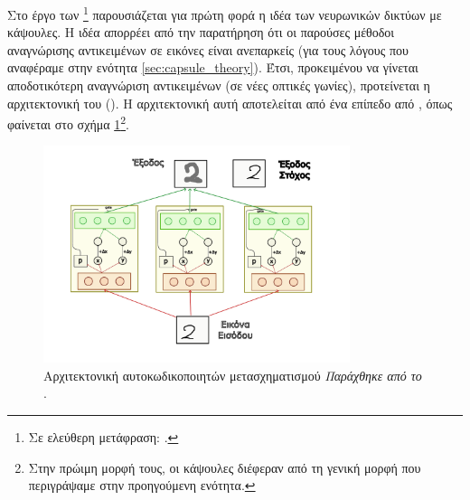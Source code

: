 \subsubsection{}

Στο έργο των \footnote{Σε ελεύθερη μετάφραση: .} \cite{hinton2011transforming} παρουσιάζεται για πρώτη φορά η ιδέα των νευρωνικών δικτύων με κάψουλες. Η ιδέα απορρέει από την παρατήρηση ότι οι παρούσες μέθοδοι αναγνώρισης αντικειμένων σε εικόνες είναι ανεπαρκείς (για τους λόγους που αναφέραμε στην ενότητα \ref{sec:capsule_theory}). Έτσι, προκειμένου να γίνεται αποδοτικότερη αναγνώριση αντικειμένων (σε νέες οπτικές γωνίες), προτείνεται η αρχιτεκτονική του  (). Η αρχιτεκτονική αυτή αποτελείται από ένα επίπεδο από , όπως φαίνεται στο σχήμα \ref{fig:trans_autoencoder}\footnote{Στην πρώιμη μορφή τους, οι κάψουλες διέφεραν από τη γενική μορφή που περιγράψαμε στην προηγούμενη ενότητα.}.\par

\begin{figure}[h]
    \centering
    \includegraphics[width=0.8\textwidth]{images/chapter realted work/transforming_auto_gr.pdf}
    \caption{Αρχιτεκτονική αυτο\textendash κωδικοποιητών μετασχηματισμού \textit{Παράχθηκε από το \href{https://inkscape.org/}{}}.}
    \label{fig:trans_autoencoder}
\end{figure}

